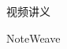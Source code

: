 \documentclass[a4paper]{article}
\newcommand{\notetitle}{}
\begin{document}
\begin{titlepage}
\centering
\vspace*{3cm}
{\Large 视频讲义\par}
\vspace{1.2cm}
{\huge\bfseries \notetitle\par}
\vspace{0.8cm}
{\large NoteWeave\par}
\vfill
\end{titlepage}

\tableofcontents
\newpage



\end{document}

